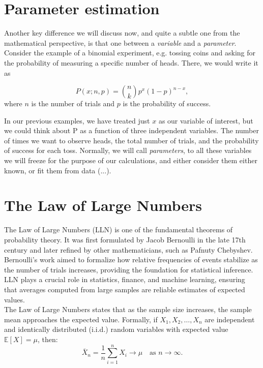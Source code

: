 \documentclass{book}
\begin{document}
\section{Parameter estimation}
Another key difference we will discuss now, and quite a subtle one from the mathematical perspective, is that one between a \textit{variable} and a \textit{parameter}. Consider the example of a binomial experiment, e.g. tossing coins and asking for the probability of measuring a specific number of heads. There, we would write it as 

\begin{equation}
    P(x; n, p) = \binom{n}{k} p^x (1-p)^{n-x},
\end{equation}
where $n$ is the number of trials and $p$ is the probability of success.

In our previous examples, we have treated just $x$ as our variable of interest, but we could think about P as a function of three independent variables. The number of times we want to observe heads, the total number of trials, and the probability of success for each toss. Normally, we will call \textit{parameters}, to all these variables we will freeze for the purpose of our calculations, and either consider them either known, or fit them from data (...).
 
 \newpage 
 
\section{The Law of Large Numbers}

The Law of Large Numbers (LLN) is one of the fundamental theorems of probability theory. It was first formulated by Jacob Bernoulli in the late 17th century and later refined by other mathematicians, such as Pafnuty Chebyshev. Bernoulli's work aimed to formalize how relative frequencies of events stabilize as the number of trials increases, providing the foundation for statistical inference. LLN plays a crucial role in statistics, finance, and machine learning, ensuring that averages computed from large samples are reliable estimates of expected values.\\

The Law of Large Numbers states that as the sample size increases, the sample mean approaches the expected value. Formally, if $X_1, X_2, \dots, X_n$ are independent and identically distributed (i.i.d.) random variables with expected value $\mathbb{E}[X] = \mu$, then:
\begin{equation}
    \bar{X}_n = \frac{1}{n} \sum_{i=1}^{n} X_i \to \mu \quad \text{as } n \to \infty.
\end{equation}
\end{document}
